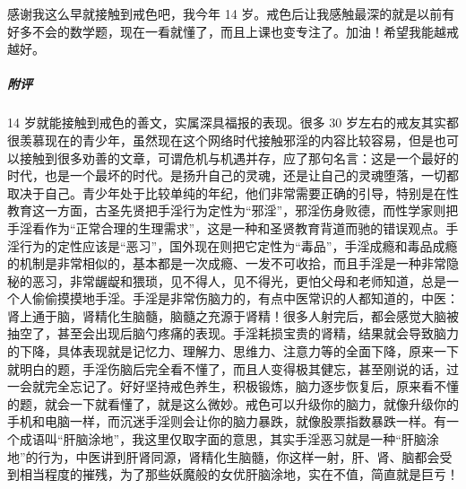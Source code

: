 \begin{case}
    感谢我这么早就接触到戒色吧，我今年 14 岁。戒色后让我感触最深的就是以前有好多不会的数学题，现在一看就懂了，而且上课也变专注了。加油！希望我能越戒越好。
    \subparagraph{附评} 14 岁就能接触到戒色的善文，实属深具福报的表现。很多 30 岁左右的戒友其实都很羡慕现在的青少年，虽然现在这个网络时代接触邪淫的内容比较容易，但是也可以接触到很多劝善的文章，可谓危机与机遇并存，应了那句名言：这是一个最好的时代，也是一个最坏的时代。是扬升自己的灵魂，还是让自己的灵魂堕落，一切都取决于自己。青少年处于比较单纯的年纪，他们非常需要正确的引导，特别是在性教育这一方面，古圣先贤把手淫行为定性为“邪淫”，邪淫伤身败德，而性学家则把手淫看作为“正常合理的生理需求”，这是一种和圣贤教育背道而驰的错误观点。手淫行为的定性应该是“恶习”，国外现在则把它定性为“毒品”，手淫成瘾和毒品成瘾的机制是非常相似的，基本都是一次成瘾、一发不可收拾，而且手淫是一种非常隐秘的恶习，非常龌龊和猥琐，见不得人，见不得光，更怕父母和老师知道，总是一个人偷偷摸摸地手淫。手淫是非常伤脑力的，有点中医常识的人都知道的，中医：肾上通于脑，肾精化生脑髓，脑髓之充源于肾精！很多人射完后，都会感觉大脑被抽空了，甚至会出现后脑勺疼痛的表现。手淫耗损宝贵的肾精，结果就会导致脑力的下降，具体表现就是记忆力、理解力、思维力、注意力等的全面下降，原来一下就明白的题，手淫伤脑后完全看不懂了，而且人变得极其健忘，甚至刚说的话，过一会就完全忘记了。好好坚持戒色养生，积极锻炼，脑力逐步恢复后，原来看不懂的题，就会一下就看懂了，就是这么微妙。戒色可以升级你的脑力，就像升级你的手机和电脑一样，而沉迷手淫则会让你的脑力暴跌，就像股票指数暴跌一样。有一个成语叫“肝脑涂地”，我这里仅取字面的意思，其实手淫恶习就是一种“肝脑涂地”的行为，中医讲到肝肾同源，肾精化生脑髓，你这样一射，肝、肾、脑都会受到相当程度的摧残，为了那些妖魔般的女优肝脑涂地，实在不值，简直就是巨亏！
\end{case}

